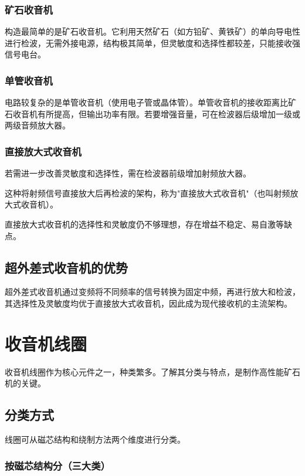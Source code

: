 \documentclass[12pt,UTF8]{ctexbook}
\begin{document}
\subsection{矿石收音机}

构造最简单的是矿石收音机。它利用天然矿石（如方铅矿、黄铁矿）的单向导电性进行检波，无需外接电源，结构极其简单，但灵敏度和选择性都较差，只能接收强信号电台。

\subsection{单管收音机}

电路较复杂的是单管收音机（使用电子管或晶体管）。单管收音机的接收距离比矿石收音机有所提高，但输出功率有限。若要增强音量，可在检波器后级增加一级或两级音频放大器。

\subsection{直接放大式收音机}

若需进一步改善灵敏度和选择性，需在检波器前级增加射频放大器。

这种将射频信号直接放大后再检波的架构，称为"直接放大式收音机"（也叫射频放大式收音机）。

直接放大式收音机的选择性和灵敏度仍不够理想，存在增益不稳定、易自激等缺点。

\section{超外差式收音机的优势}

超外差式收音机通过变频将不同频率的信号转换为固定中频，再进行放大和检波，其选择性及灵敏度均优于直接放大式收音机，因此成为现代接收机的主流架构。

\chapter{收音机线圈}
\label{chap:coils}

收音机线圈作为核心元件之一，种类繁多。了解其分类与特点，是制作高性能矿石机的关键。

\section{分类方式}

线圈可从磁芯结构和绕制方法两个维度进行分类。

\subsection{按磁芯结构分（三大类）}
\end{document}
